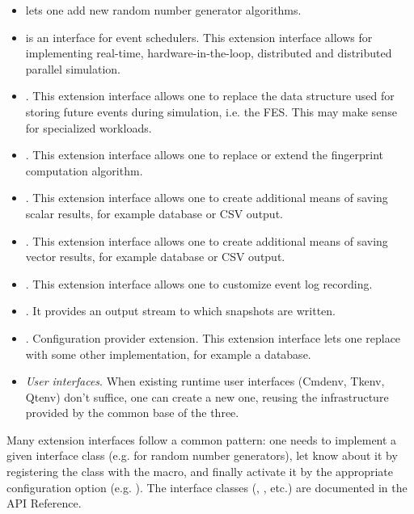 \begin{itemize}
   \item {} lets one add new random number generator algorithms.
   \item {} is an interface for event schedulers.
     This extension interface allows for implementing real-time,
     hardware-in-the-loop, distributed and distributed parallel simulation.
   \item {}. This extension interface allows one to
     replace the data structure used for storing future events during
     simulation, i.e. the FES. This may make sense for specialized
     workloads.
   \item {}. This extension interface allows one
     to replace or extend the fingerprint computation algorithm.
   \item {}. This extension interface allows
     one to create additional means of saving scalar results, for example
     database or CSV output.
   \item {}. This extension interface allows
     one to create additional means of saving vector results, for example
     database or CSV output.
   \item {}. This extension interface allows one
     to customize event log recording.
   \item {}. It provides an output stream to which
     snapshots are written.
   \item {}. Configuration provider extension.
     This extension interface lets one replace 
     with some other implementation, for example a database.
   \item \textit{User interfaces}. When existing runtime user interfaces
     (Cmdenv, Tkenv, Qtenv) don't suffice, one can create a new one,
     reusing the infrastructure provided by the common base of the three.
\end{itemize}

Many extension interfaces follow a common pattern: one needs to implement a
given interface class (e.g.  for random number generators),
let {\opp} know about it by registering the class with the
 macro, and finally activate it by the appropriate
configuration option (e.g. ). The interface classes
(, , etc.) are documented in the API
Reference.

